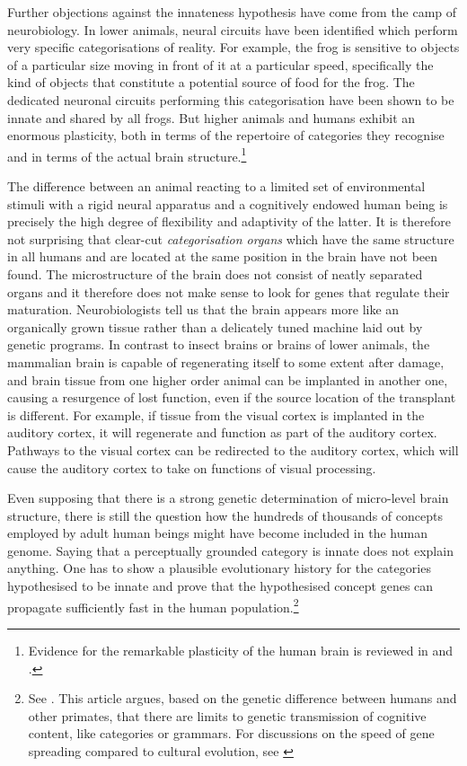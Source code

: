 Further objections against the innateness hypothesis have come from the camp 
of neurobiology. In lower animals, neural circuits have been identified which perform 
very specific categorisations of reality. For example, the 
frog is sensitive to objects of a particular
size moving in front of it at a particular speed, specifically the
kind of objects that constitute a potential 
source of food for the frog. The dedicated neuronal 
circuits performing this categorisation have been 
shown to be innate and shared by all frogs. But higher 
animals and humans
exhibit an enormous plasticity, both in terms of the 
repertoire of categories they recognise and in terms of 
the actual brain structure.\footnote{
Evidence for the remarkable plasticity of the human 
brain is reviewed in \cite{Edelman:1987} and \cite{Elman:1998}. }

The difference between an animal
reacting to a limited set of environmental stimuli with 
a rigid neural apparatus and a cognitively endowed
human being is precisely the high degree of flexibility and 
adaptivity of the latter.
It is therefore not surprising that clear-cut 
{\it categorisation organs} which have the same structure in 
all humans and are located at the same position in the 
brain have not been found. The microstructure of the
brain does not consist of
neatly separated organs and it therefore does not make 
sense to look for genes that regulate their maturation. 
Neurobiologists tell us that 
the brain appears more like an organically grown 
tissue rather than a delicately tuned machine laid
out by genetic programs. In contrast to insect brains or 
brains of lower animals, the mammalian brain is 
capable of regenerating itself to some extent after
damage, and brain tissue
from one higher order animal can be implanted in another
one, causing a resurgence of lost function, even if the 
source location of the transplant is different. 
For example, if tissue from the visual cortex is
implanted in the auditory cortex, it will 
regenerate and function as part of the auditory 
cortex. Pathways to the visual cortex can be
redirected to the auditory cortex, which will cause 
the auditory cortex to take on functions of visual processing. 

Even supposing that there is a strong genetic
determination of micro-level brain structure, there is 
still the question how the hundreds of thousands of concepts 
employed by adult human beings might have become 
included in the human genome. Saying that a perceptually 
grounded category is innate does not explain anything.
One has to show a plausible evolutionary history for 
the categories hypothesised to be innate and prove 
that the hypothesised concept genes can propagate sufficiently 
fast in the human population.\footnote{
See \cite{Worden:1995}. 
This article argues, based on the genetic difference
between humans and other primates, that there are limits 
to genetic transmission of cognitive content, like 
categories or grammars. For discussions on the speed
of gene spreading compared to cultural evolution, 
see \cite{Cavalli:1995}}

